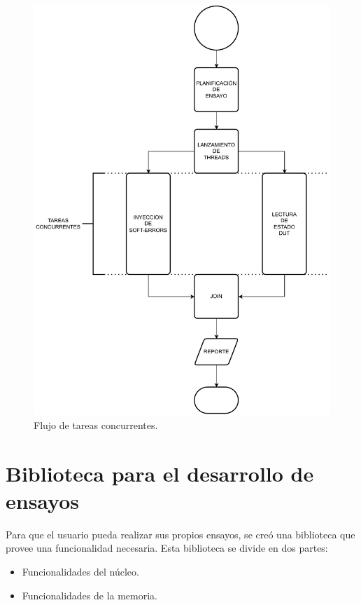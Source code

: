 \begin{figure}[htbp]
	\centering
	\includegraphics[width=\textwidth]{./Figures/concurrencia.pdf}
    \caption{Flujo de tareas concurrentes.}
	\label{fig:concurrencia}
\end{figure}

\section{Biblioteca para el desarrollo de ensayos}
\label{fig:biblioteca}

Para que el usuario pueda realizar sus propios ensayos, se creó una biblioteca que provee una funcionalidad necesaria.
Esta biblioteca se divide en dos partes:

\begin{itemize}
    \item Funcionalidades del núcleo.
    \item Funcionalidades de la memoria.
\end{itemize}

